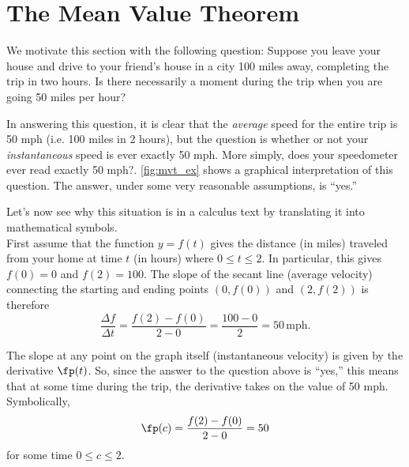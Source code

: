 \section{The Mean Value Theorem}\label{sec:mvt}

We motivate this section with the following question: Suppose you leave your house and drive to your friend's house in a city 100 miles away, completing the trip in two hours.  Is there necessarily a moment during the trip when you are going 50 miles per hour?

In answering this question, it is clear that the \textit{average} speed for the entire trip is 50 mph (i.e. 100 miles in 2 hours), but the question is whether or not your \textit{instantaneous} speed is ever exactly 50 mph. More simply, does your speedometer ever read exactly 50 mph?.  \autoref{fig:mvt_ex} shows a graphical interpretation of this question.  The answer, under some very reasonable assumptions, is ``yes.''


Let's now see why this situation is in a calculus text by translating it into mathematical symbols.\\

First assume that the function $y = f(t)$ gives the distance (in miles) traveled from your home at time $t$ (in hours) where $0\le t\le 2$.  In particular, this gives $f(0)=0$ and $f(2)=100$.  The slope of the secant line (average velocity) connecting the starting and ending points $(0,f(0))$ and $(2,f(2))$ is therefore 
\[
\frac{\Delta f}{\Delta t} = \frac{f(2)-f(0)}{2-0} = \frac{100-0}{2} = 50 \, \text{mph}.
\]

The slope at any point on the graph itself (instantaneous velocity) is given by the derivative $\fp(t)$.  So, since the answer to the question above is ``yes,'' this means that at some time during the trip, the derivative takes on the value of 50 mph.  Symbolically, 
\[\fp(c) = \frac{f(2)-f(0)}{2-0} = 50\]
for some time $0\le c \le 2.$\bigskip

